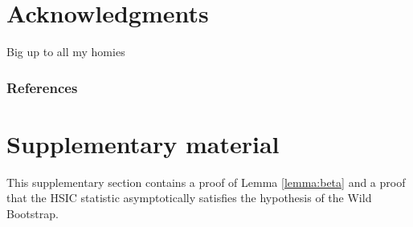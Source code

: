 \documentclass[]{article}
\begin{document}
%
%
%



\section*{Acknowledgments} 
Big up to all my homies

\subsubsection*{References}




\appendix
\onecolumn

\section{Supplementary material}
This supplementary section contains a proof of Lemma \ref{lemma:beta} and a proof that the HSIC statistic asymptotically satisfies the hypothesis of the Wild Bootstrap.
\end{document}
